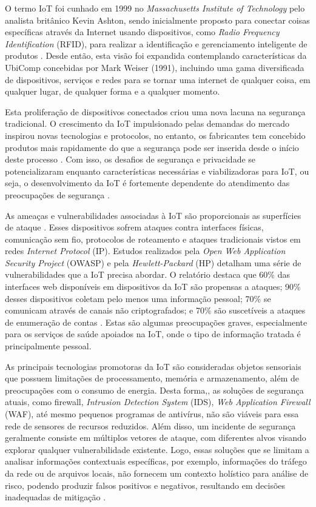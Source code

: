 \documentclass[tid,table]{texufpel} %
\begin{document}
O termo IoT foi cunhado em 1999 no \textit{Massachusetts Institute of Technology} pelo analista britânico Kevin Ashton, sendo inicialmente proposto para conectar coisas específicas através da Internet usando dispositivos, como \textit{Radio Frequency Identification} (RFID), para realizar a identificação e gerenciamento inteligente de produtos \cite{ashton09}. Desde então, esta visão foi expandida contemplando características da UbiComp concebidas por Mark Weiser (1991)\nocite{weiser91}, incluindo uma gama diversificada de dispositivos, serviços e redes para se tornar uma internet de qualquer coisa, em qualquer lugar, de qualquer forma e a qualquer momento. 

Esta proliferação de dispositivos conectados criou uma nova lacuna na segurança tradicional. O crescimento da IoT impulsionado pelas demandas do mercado inspirou novas tecnologias e protocolos, no entanto, os fabricantes tem concebido produtos mais rapidamente do que a segurança pode ser inserida desde o início deste processo \cite{sans17}. Com isso, os desafios de segurança e privacidade se potencializaram enquanto características necessárias e viabilizadoras para IoT, ou seja, o desenvolvimento da IoT é fortemente dependente do atendimento das preocupações de segurança \cite{sicari15}.


As ameaças e vulnerabilidades associadas à IoT são proporcionais as superfícies de ataque \cite{sans17}. Esses dispositivos sofrem ataques contra interfaces físicas, comunicação sem fio, protocolos de roteamento e ataques tradicionais vistos em redes \textit{Internet Protocol} (IP). Estudos realizados pela \textit{Open Web Application Security Project } (OWASP) e pela \textit{Hewlett-Packard} (HP) detalham uma série de vulnerabilidades que a IoT precisa abordar. O relatório destaca que 60\% das interfaces web disponíveis em dispositivos da IoT são propensas a ataques; 90\% desses dispositivos coletam pelo menos uma informação pessoal; 70\% se comunicam através de canais não criptografados; e 70\% são suscetíveis a ataques de enumeração de contas \cite{hpiot15, owaspiot18}. Estas são algumas preocupações graves, especialmente para os serviços de saúde apoiados na IoT, onde o tipo de informação tratada é principalmente pessoal.

As principais tecnologias promotoras da IoT são consideradas objetos sensoriais que possuem limitações de processamento, memória e armazenamento, além de preocupações com o consumo de energia. Desta forma,, as soluções de segurança atuais, como firewall, \textit{Intrusion Detection System} (IDS), \textit{Web Application Firewall} (WAF), até mesmo pequenos programas de antivírus, não são viáveis para essa rede de sensores de recursos reduzidos. Além disso, um incidente de segurança geralmente consiste em múltiplos vetores de ataque, com diferentes alvos visando explorar qualquer vulnerabilidade existente. Logo, essas soluções que se limitam a analisar informações contextuais específicas, por exemplo, informações do tráfego da rede ou de arquivos locais, não fornecem um contexto holístico para análise de risco, podendo produzir falsos positivos e negativos, resultando em decisões inadequadas de mitigação \cite{aman15}. 
\end{document}
